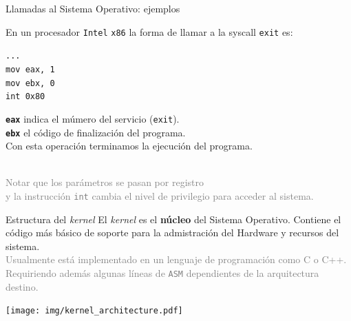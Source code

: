 \documentclass[aspectratio=169]{beamer}
\begin{document}
\begin{frame}[fragile]{Llamadas al Sistema Operativo: ejemplos}
\begin{textblock}{65}
\begin{tcolorbox}[size=small,width=\textwidth,sharp corners,title={\footnotesize Ejemplo}]
    \footnotesize
    En un procesador \texttt{Intel} \texttt{x86} la forma de llamar a la syscall \texttt{exit} es:
    \begin{tcolorbox}[left skip=2.2cm,size=fbox,colback={verdeuca!30},width=2cm,sharp corners,title={}]
    \verb|...|\\
    \verb|mov eax, 1|\\
    \verb|mov ebx, 0|\\
    \verb|int 0x80|
    \end{tcolorbox}
    \textcolor{naranjauca}{\textbf{\texttt{eax}}} indica el múmero del servicio (\texttt{exit}).\\
    \textcolor{naranjauca}{\textbf{\texttt{ebx}}} el código de finalización del programa.\\
    Con esta operación terminamos la ejecución del programa.\\ \\
    \end{tcolorbox}
    \small
    \textcolor{gray}{Notar que los parámetros se pasan por registro\\
    y la instrucción \texttt{int} cambia el nivel de privilegio para acceder al sistema.}
    \end{textblock}
\end{frame}

\begin{frame}{Estructura del \emph{kernel}}
    El \emph{kernel} es el \textbf{núcleo} del Sistema Operativo.
    Contiene el código más básico de soporte para la admistración del Hardware y recursos del sistema.\\
    \medskip
    \textcolor{gray}{Usualmente está implementado en un lenguaje de programación como C o C++.\\
    Requiriendo además algunas líneas de \texttt{ASM} dependientes de la arquitectura destino.}\\
    \bigskip
    \begin{center}
    \texttt{[image: img/kernel\_architecture.pdf]}
    \end{center}
\end{frame}
\end{document}
